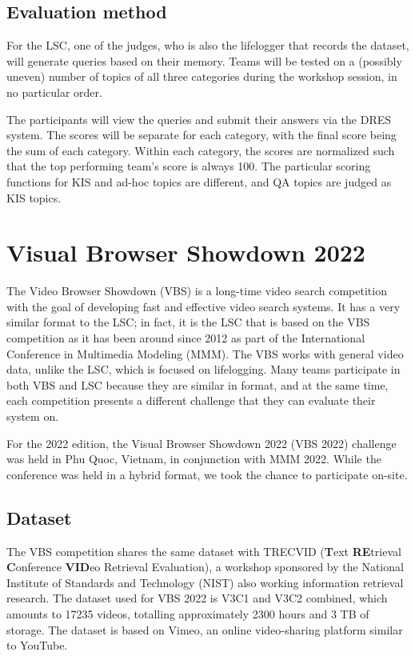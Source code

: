 \vspace{-2mm}
\subsection{Evaluation method}

\vspace{-2mm}
For the LSC, one of the judges, who is also the lifelogger that records the dataset, will generate queries based on their memory. Teams will be tested on a (possibly uneven) number of topics of all three categories during the workshop session, in no particular order. 

\vspace{-2mm}
The participants will view the queries and submit their answers via the DRES system. The scores will be separate for each category, with the final score being the sum of each category. Within each category, the scores are normalized such that the top performing team's score is always 100. The particular scoring functions for KIS and ad-hoc topics are different, and QA topics are judged as KIS topics.



\section{Visual Browser Showdown 2022}

The Video Browser Showdown (VBS) is a long-time video search competition with the goal of developing fast and effective video search systems. It has a very similar format to the LSC; in fact, it is the LSC that is based on the VBS competition as it has been around since 2012 as part of the International Conference in Multimedia Modeling (MMM). The VBS works with general video data, unlike the LSC, which is focused on lifelogging. Many teams participate in both VBS and LSC because they are similar in format, and at the same time, each competition presents a different challenge that they can evaluate their system on.

For the 2022 edition, the Visual Browser Showdown 2022 (VBS 2022) challenge was held in Phu Quoc, Vietnam, in conjunction with MMM 2022. While the conference was held in a hybrid format, we took the chance to participate on-site.

\subsection{Dataset}

The VBS competition shares the same dataset with TRECVID (\textbf{T}ext \textbf{RE}trieval \textbf{C}onference \textbf{VID}eo Retrieval Evaluation), a workshop sponsored by the National Institute of Standards and Technology (NIST) also working information retrieval research. The dataset used for VBS 2022 is V3C1 and V3C2 combined, which amounts to 17235 videos, totalling approximately 2300 hours and 3 TB of storage. The dataset is based on Vimeo, an online video-sharing platform similar to YouTube.

